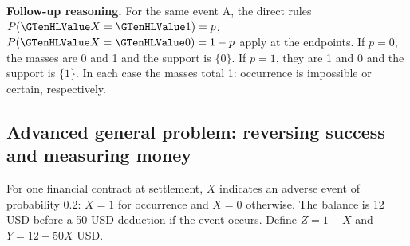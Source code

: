 \textbf{Follow-up reasoning.} For the same event A, the direct rules $P(\Indicator{X}=\Indicator{1})=p$, $P(\Indicator{X}=\Indicator{0})=1-p$ apply at the endpoints. If $p=0$, the masses are 0 and 1 and the support is $\{0\}$. If $p=1$, they are 1 and 0 and the support is $\{1\}$. In each case the masses total 1: occurrence is impossible or certain, respectively.

\clearpage
\subsection{Advanced general problem: reversing success and measuring money}\label{prob:c3-reverse}
For one financial contract at settlement, $X$ indicates an adverse event of probability 0.2: $X=1$ for occurrence and $X=0$ otherwise. The balance is 12 USD before a 50 USD deduction if the event occurs. Define $Z=1-X$ and $Y=12-50X$ USD.


